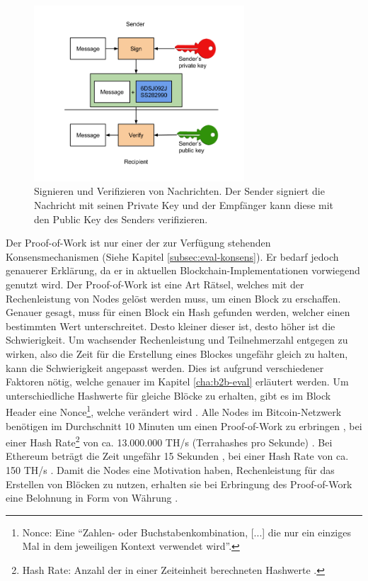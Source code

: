 \begin{figure}[htb]
	\centering
	  \includegraphics[width=0.7\textwidth,angle=0]{images/key-signing}
	  \caption{Signieren und Verifizieren von Nachrichten. Der Sender signiert die Nachricht mit seinen Private Key und der Empfänger kann diese mit den Public Key des Senders verifizieren.}
	  \label{fig:key-signing}
\end{figure}
	

Der Proof-of-Work ist nur einer der zur Verfügung stehenden Konsensmechanismen (Siehe Kapitel \ref{subsec:eval-konsens}). Er bedarf jedoch genauerer Erklärung, da er in aktuellen Blockchain-Implementationen vorwiegend genutzt wird. Der Proof-of-Work ist eine Art Rätsel, welches mit der Rechenleistung von Nodes gelöst werden muss, um einen Block zu erschaffen. Genauer gesagt, muss für einen Block ein Hash gefunden werden, welcher einen bestimmten Wert unterschreitet. Desto kleiner dieser ist, desto höher ist die Schwierigkeit. Um wachsender Rechenleistung und Teilnehmerzahl entgegen zu wirken, also die Zeit für die Erstellung eines Blockes ungefähr gleich zu halten, kann die Schwierigkeit angepasst werden. Dies ist aufgrund verschiedener Faktoren nötig, welche genauer im Kapitel \ref{cha:b2b-eval} erläutert werden. Um unterschiedliche Hashwerte für gleiche Blöcke zu erhalten, gibt es im Block Header eine Nonce\footnote{Nonce: Eine ``Zahlen- oder Buchstabenkombination, [...] die nur ein einziges Mal in dem jeweiligen Kontext verwendet wird''\cite{Nonce2017}.}, welche verändert wird \cite{NakamotoBitcoinPeertoPeerElectronic2008}. Alle Nodes im Bitcoin-Netzwerk benötigen im Durchschnitt 10 Minuten um einen Proof-of-Work zu erbringen \cite{AntonopoulosMasteringbitcoin2015}, bei einer Hash Rate\footnote{Hash Rate: Anzahl der in einer Zeiteinheit berechneten Hashwerte \cite{GlossarBitcoin}.} von ca. 13.000.000 TH/s (Terrahashes pro Sekunde) \cite{HashRate}. Bei Ethereum beträgt die Zeit ungefähr 15 Sekunden \cite{EthereumAverageBlockTime}, bei einer Hash Rate von ca. 150 TH/s \cite{EthereumNetworkHashRate}. Damit die Nodes eine Motivation haben, Rechenleistung für das Erstellen von Blöcken zu nutzen, erhalten sie bei Erbringung des Proof-of-Work eine Belohnung in Form von Währung \cite{NakamotoBitcoinPeertoPeerElectronic2008} \cite{EthereumWhitepaper2017}. 

